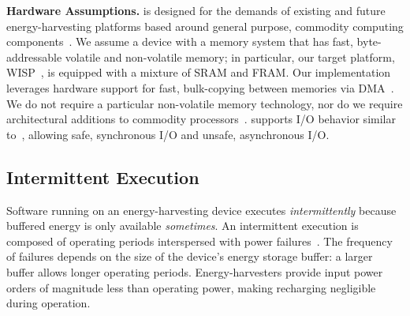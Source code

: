 
\textbf{Hardware Assumptions.} \sys is designed for the demands of existing and future energy-harvesting platforms based around general purpose, commodity computing components~\cite{wisp,msp430datasheet}. We assume a device with a memory system that has fast, byte-addressable volatile and non-volatile memory; in particular, our target platform, WISP~\cite{wisp}, is equipped with a mixture of SRAM and FRAM. Our implementation leverages hardware support for fast, bulk-copying between memories via DMA~\cite{msp430datasheet}. We do not require a particular non-volatile memory technology, nor do we require architectural additions to commodity processors~\cite{su_date_2017,ratchet,quickrecall,nvp}. \sys supports I/O behavior similar to~\cite{alpaca,chain}, allowing safe, synchronous I/O and unsafe, asynchronous I/O.

\subsection{Intermittent Execution}
\label{sec:background_consistency}

%
Software running on an energy-harvesting device executes {\em intermittently} because buffered energy is only available \emph{sometimes}. An intermittent execution is composed of operating periods interspersed with power failures~\cite{dino,chain,alpaca,ratchet}. The frequency of failures depends on the size of the device's energy storage buffer: a larger buffer allows longer operating periods. Energy-harvesters provide input power orders of magnitude less than operating power, making recharging negligible during operation.

